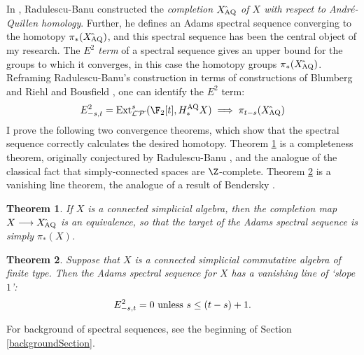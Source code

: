 \documentclass[11pt]{article}
\theoremstyle{plain}
\newtheorem{theorem}{Theorem}
\begin{document}
In \cite{radelescuBanu.pdf}, Radulescu-Banu constructed the \emph{completion $X{\hat{\,}_\textup{\!\!AQ}}$ of $X$ with respect to Andr\'e-Quillen homology}. Further, he defines an Adams spectral sequence converging to the homotopy $\pi_*(X{\hat{\,}_\textup{\!\!AQ}})$, and this spectral sequence has been the central object of my research. The \emph{$E^2$ term} of a spectral sequence gives an upper bound for the groups to which it converges, in this case the homotopy groups $\pi_*(X{\hat{\,}_\textup{\!\!AQ}})$. %
Reframing Radulescu-Banu's construction in terms of constructions of Blumberg and Riehl \cite{BlumRiehlResolutions.pdf} and Bousfield \cite{BousCosimpResnHtpySS.pdf}, one can identify the $E^2$ term:
\[E^2_{-s,t}=\Ext^s_{\calL\hat{\,}\calP\hat{\,}}(\F_2[t],H_*^\textup{AQ}X)\implies \pi_{t-s}(X{\hat{\,}_\textup{\!\!AQ}})\]
I prove the following two convergence theorems, which show that the spectral sequence correctly calculates the desired homotopy. Theorem \ref{completenesstheorem} is a completeness theorem, originally conjectured by Radulescu-Banu \cite[\S1.6.4]{radelescuBanu.pdf}, and the analogue of the classical fact that simply-connected spaces are $\Z$-complete. Theorem \ref{vanishing-line-theorem} is a vanishing line theorem, the analogue of a result of Bendersky \cite{BenderskySomeCalculations.pdf}.
\begin{theorem}\label{completenesstheorem}
If $X$ is a connected simplicial algebra, then the completion map $X\to X{\hat{\,}_\textup{\!\!AQ}}$ is an equivalence, so that the target of the Adams spectral sequence is simply $\pi_*(X)$.
\end{theorem}
\begin{theorem}\label{vanishing-line-theorem}
Suppose that $X$ is a connected simplicial commutative algebra of finite type. Then the Adams spectral sequence for $X$ has a vanishing line of `slope $1$':
\[E^2_{-s,t}=0\textup{\ unless $s\leq (t-s)+1$}.\]
\end{theorem}
\noindent For background of spectral sequences, see the beginning of Section \ref{backgroundSection}.
\end{document}
